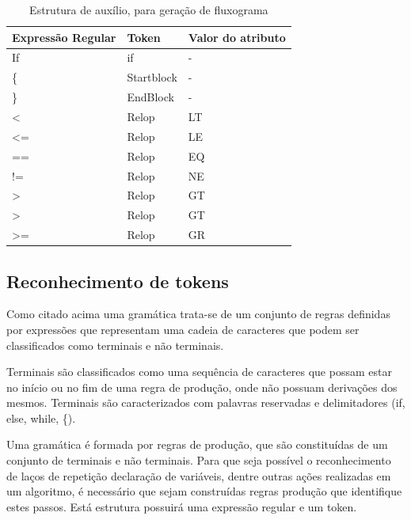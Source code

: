 \begin{table}[htbp!]
  \centering
    \caption{Estrutura de auxílio, para geração de fluxograma}
      \begin{tabularx}{\textwidth}{|X|X|X|}
      \hline
      \textbf{Expressão Regular} &  \textbf{Token} & \textbf{Valor do atributo} \\
      \hline
      If & if & - \\
      \hline
      \{ & Startblock & - \\
      \hline
      \} & EndBlock & - \\
      \hline
      < & Relop & LT \\
      \hline
      <= & Relop & LE \\
      \hline
      == & Relop & EQ \\
      \hline
      != & Relop & NE \\
      \hline
      > & Relop & GT \\
      \hline
      > & Relop & GT \\
      \hline
      >= & Relop & GR \\
      \hline
      \end{tabularx}
  \label{Tabela4}
\end{table}

\pagebreak

\subsection{Reconhecimento de tokens}
\par Como citado acima uma gramática trata-se de um conjunto de regras definidas por expressões que representam uma cadeia de caracteres que podem ser classificados como terminais e não terminais. 
\par Terminais são classificados como uma sequência de caracteres que possam estar no início ou no fim de uma regra de produção, onde não possuam derivações dos mesmos. Terminais são caracterizados com palavras reservadas e delimitadores (if, else, while, \{).

\par Uma gramática é formada por regras de produção, que são constituídas de um conjunto de terminais e não terminais. Para que seja possível o reconhecimento de laços de repetição declaração de variáveis, dentre outras ações realizadas em um algoritmo, é necessário que sejam construídas regras produção que identifique estes passos. Está estrutura possuirá uma expressão regular e um token.

